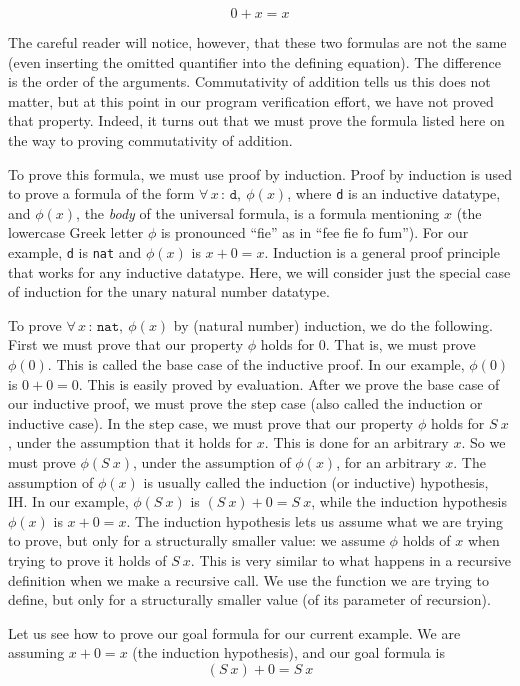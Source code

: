 \documentclass{book}[12pt]
\begin{document}
\[ 0 + x = x \]

\noindent The careful reader will notice, however, that these two
formulas are not the same (even inserting the omitted quantifier into
the defining equation).  The difference is the order of the arguments.
Commutativity of addition tells us this does not matter, but at this
point in our program verification effort, we have not proved that
property.  Indeed, it turns out that we must prove the formula listed
here on the way to proving commutativity of addition.

To prove this formula, we must use proof by induction.  Proof by
induction is used to prove a formula of the form $\forall\,
x\,:\,\texttt{d},\ \phi(x)$, where \texttt{d} is an inductive datatype,
and $\phi(x)$, the \emph{body} of the universal formula, is a formula
mentioning $x$ (the lowercase Greek letter $\phi$ is pronounced
``fie'' as in ``fee fie fo fum'').  For our example, \texttt{d} is
\texttt{nat} and $\phi(x)$ is $x + 0 = x$.  Induction is a general
proof principle that works for any inductive datatype.  Here, we will
consider just the special case of induction for the unary natural number
datatype.  

To prove $\forall\, x\,:\,\texttt{nat},\ \phi(x)$ by (natural number)
induction, we do the following.  First we must prove that our property
$\phi$ holds for $0$.  That is, we must prove $\phi(0)$.  This is
called the base case of the inductive proof.  In our example,
$\phi(0)$ is $0 + 0 = 0$.  This is easily proved by evaluation.  After
we prove the base case of our inductive proof, we must prove the step
case (also called the induction or inductive case).  In the step case,
we must prove that our property $\phi$ holds for $S\ x$, under the
assumption that it holds for $x$.  This is done for an arbitrary $x$.
So we must prove $\phi(S\ x)$, under the assumption of $\phi(x)$, for
an arbitrary $x$.  The assumption of $\phi(x)$ is usually called the
induction (or inductive) hypothesis, IH.  In our example, $\phi(S\ x)$
is $(S\ x) + 0 = S\ x$, while the induction hypothesis $\phi(x)$ is
$x + 0 = x$.  The induction hypothesis lets us assume what we are
trying to prove, but only for a structurally smaller value: we assume
$\phi$ holds of $x$ when trying to prove it holds of $S\ x$.  This is
very similar to what happens in a recursive definition when we make a
recursive call.  We use the function we are trying to define, but only
for a structurally smaller value (of its parameter of recursion).

Let us see how to prove our goal formula for our current example. 
We are assuming $x + 0 = x$ (the induction hypothesis), and our
goal formula is
\[(S\ x) + 0 = S\ x\]
\end{document}

